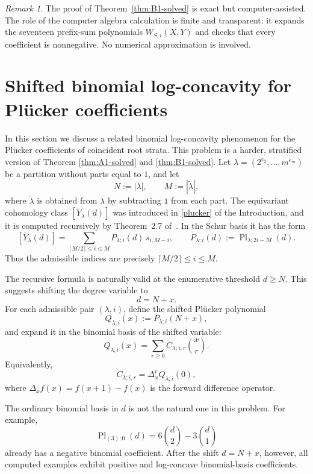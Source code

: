 \documentclass[11pt]{amsart}
\numberwithin{equation}{section}
\theoremstyle{remark}
\newtheorem{remark}[theorem]{Remark}
\begin{document}
\begin{remark}
The proof of Theorem~\ref{thm:B1-solved} is exact but computer-assisted.  The role of the computer algebra calculation is finite and transparent: it expands the seventeen prefix-sum polynomials $W_{S,i}(X,Y)$ and checks that every coefficient is nonnegative.  No numerical approximation is involved.
\end{remark}

\section{Shifted binomial log-concavity for Pl\"ucker coefficients}
\label{sec:plucker-shifted-binomial-lc}

In this section we discuss a related binomial log-concavity phenomenon for the
Pl\"ucker coefficients of coincident root strata. This problem is a harder, stratified version of Theorem \ref{thm:A1-solved} and \ref{thm:B1-solved}.
Let
$\lambda=(2^{e_2},\ldots,m^{e_m})$ be a partition without parts equal
to $1$, and let
\[
  N:=|\lambda|,\qquad M:=|\tilde\lambda|,
\]
where $\tilde\lambda$ is obtained from $\lambda$ by subtracting $1$
from each part.  The equivariant cohomology class 
$[\overline Y_\lambda(d)]$ was introduced in \eqref{plucker} of the Introduction, and it is computed recursively by
Theorem~2.7 of~\cite{feher2025polynomiality}.  In the Schur basis it has
the form
\[
  [\overline Y_\lambda(d)]
  =
  \sum_{\lceil M/2\rceil\le i\le M}
  P_{\lambda;i}(d)\,s_{i,M-i},
  \qquad
  P_{\lambda;i}(d):=\operatorname{Pl}_{\lambda;2i-M}(d).
\]
Thus the admissible indices are precisely $\lceil M/2\rceil\le i\le M$.

The recursive formula is naturally valid at the enumerative threshold
$d\ge N$.  This suggests shifting the degree variable to
\[
  d=N+x.
\]
For each admissible pair $(\lambda,i)$, define the shifted Pl\"ucker
polynomial
\[
  Q_{\lambda;i}(x):=P_{\lambda;i}(N+x),
\]
and expand it in the binomial basis of the shifted variable:
\[
  Q_{\lambda;i}(x)=\sum_{r\ge0} C_{\lambda;i,r}\binom{x}{r}.
\]
Equivalently,
\[
  C_{\lambda;i,r}=\Delta_x^r Q_{\lambda;i}(0),
\]
where $\Delta_x f(x)=f(x+1)-f(x)$ is the forward difference operator.

The ordinary binomial basis in $d$ is not the natural one in this
problem.  For example,
\[
  \operatorname{Pl}_{(3);0}(d)
  =
  6\binom d2-3\binom d1
\]
already has a negative binomial coefficient.  After the shift
$d=N+x$, however, all computed examples exhibit positive and
log-concave binomial-basis coefficients.
\end{document}
